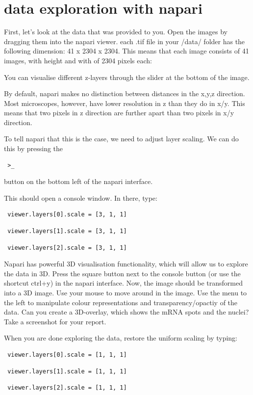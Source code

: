\documentclass[11pt]{article} %
\begin{document}
\section{data exploration with napari}
First, let's look at the data that was provided to you. 
Open the images by dragging them into the napari viewer. 
each .tif file in your /data/ folder has the following dimension: 41 x 2304 x 2304.
This means that each image consists of 41 images, with height and with of 2304 pixels each:
 

You can visualise different z-layers through the slider at the bottom of the image. 

By default, napari makes no distinction between distances in the x,y,z direction. 
Most microscopes, however, have lower resolution in z than they do in x/y. 
This means that two pixels in z direction are further apart than two pixels in x/y direction.  

To tell napari that this is the case, we need to adjust layer scaling. We can do this by pressing the \begin{verbatim} >_ \end{verbatim}
button on the bottom left of the napari interface. 

This should open a console window. In there, type:

\begin{verbatim} viewer.layers[0].scale = [3, 1, 1] \end{verbatim}
\begin{verbatim} viewer.layers[1].scale = [3, 1, 1] \end{verbatim}
\begin{verbatim} viewer.layers[2].scale = [3, 1, 1] \end{verbatim}


Napari has powerful 3D visualisation functionality, which will allow us to explore the data in 3D. Press the square button next to the console button (or use the shortcut ctrl+y) in the napari interface. Now, the image should be transformed into a 3D image. 
Use your mouse to move around in the image. Use the menu to the left to manipulate colour representations and transparency/opactiy of the data. 
Can you create a 3D-overlay, which shows the mRNA spots and the nuclei? Take a screenshot for your report. 

When you are done exploring the data, restore the uniform scaling by typing:

\begin{verbatim} viewer.layers[0].scale = [1, 1, 1] \end{verbatim}
\begin{verbatim} viewer.layers[1].scale = [1, 1, 1] \end{verbatim}
\begin{verbatim} viewer.layers[2].scale = [1, 1, 1] \end{verbatim}
\end{document}
